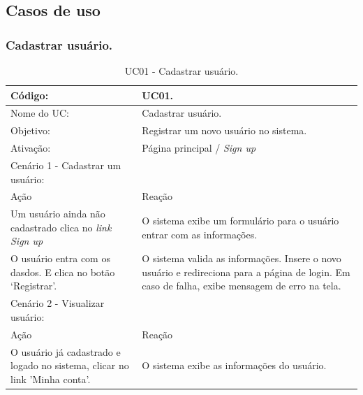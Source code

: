 \documentclass[11pt]{article}
\begin{document}
    \clearpage

    \subsection{Casos de uso}

      \subsubsection{Cadastrar usuário.}

        \begin{table}[h]
          \begin{center}
            \begin{tabular}{ | p{7cm} | p{8cm} | }
              \hline
              Código: \cellcolor{gray} & UC01. \\
              \hline
              Nome do UC: \cellcolor{gray} & Cadastrar usuário. \\
              \hline
              Objetivo: \cellcolor{gray} & Registrar um novo usuário no sistema. \\
              \hline
              Ativação: \cellcolor{gray} & Página principal / \em Sign up \\
              \hline
              \hline
              Cenário 1 - Cadastrar um usuário: &  \\
              \hline
              Ação\cellcolor{gray} & Reação\cellcolor{gray} \\
              \hline
              Um usuário ainda não cadastrado clica no \em link Sign up & O sistema exibe um formulário para o usuário entrar com as informações. \\
              \hline
              O usuário entra com os dasdos. E clica no botão ‘Registrar’. & O sistema valida as informações. Insere o novo usuário e redireciona para a página de login. Em caso de falha, exibe mensagem de erro na tela. \\
              \hline
              \hline
              Cenário 2 - Visualizar usuário: &  \\
              \hline
              Ação\cellcolor{gray} & Reação\cellcolor{gray} \\
              \hline
              O usuário já cadastrado e logado no sistema, clicar no link 'Minha conta'. & O sistema exibe as informações do usuário. \\
              \hline
            \end{tabular}
            \caption{UC01 - Cadastrar usuário.}
          \end{center}
        \end{table}
    
\end{document}

